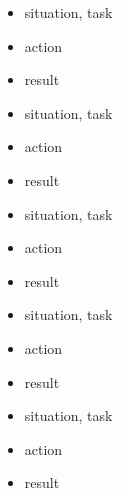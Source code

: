 \documentclass{resume}
\begin{document}
\begin{onehalfspacing}
\begin{itemize}
  \item situation, task
  \item action
  \item result
\end{itemize}
\end{onehalfspacing}

\begin{onehalfspacing}
\begin{itemize}
  \item situation, task
  \item action
  \item result
\end{itemize}
\end{onehalfspacing}

\begin{onehalfspacing}
\begin{itemize}
  \item situation, task
  \item action
  \item result
\end{itemize}
\end{onehalfspacing}

\begin{onehalfspacing}
\begin{itemize}
  \item situation, task
  \item action
  \item result
\end{itemize}
\end{onehalfspacing}

\begin{onehalfspacing}
\begin{itemize}
  \item situation, task
  \item action
  \item result
\end{itemize}
\end{onehalfspacing}
\end{document}
